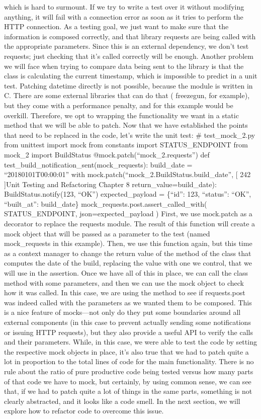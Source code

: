 \documentclass[a4paper,10pt,english]{sphinxmanual}
\begin{document}
which is hard to surmount. If we try to write a test over it without modifying anything, it
will fail with a connection error as soon as it tries to perform the HTTP connection.
As a testing goal, we just want to make sure that the information is composed correctly, and
that library requests are being called with the appropriate parameters. Since this is an
external dependency, we don’t test requests; just checking that it’s called correctly will be
enough.
Another problem we will face when trying to compare data being sent to the library is that
the class is calculating the current timestamp, which is impossible to predict in a unit test.
Patching datetime directly is not possible, because the module is written in C. There are
some external libraries that can do that ( freezegun, for example), but they come with a
performance penalty, and for this example would be overkill. Therefore, we opt to
wrapping the functionality we want in a static method that we will be able to patch.
Now that we have established the points that need to be replaced in the code, let’s write the
unit test:
\# test\_mock\_2.py
from unittest import mock
from constants import STATUS\_ENDPOINT
from mock\_2 import BuildStatus
@mock.patch(“mock\_2.requests”)
def test\_build\_notification\_sent(mock\_requests):
build\_date = “2018\sphinxhyphen{}01\sphinxhyphen{}01T00:00:01”
with mock.patch(“mock\_2.BuildStatus.build\_date”,
{[} 242 {]}Unit Testing and Refactoring
Chapter 8
return\_value=build\_date):
BuildStatus.notify(123, “OK”)
expected\_payload = \{“id”: 123, “status”: “OK”, “built\_at”:
build\_date\}
mock\_requests.post.assert\_called\_with(
STATUS\_ENDPOINT, json=expected\_payload
)
First, we use mock.patch as a decorator to replace the requests module. The result of this
function will create a mock object that will be passed as a parameter to the test
(named mock\_requests in this example). Then, we use this function again, but this time as
a context manager to change the return value of the method of the class that computes the
date of the build, replacing the value with one we control, that we will use in the assertion.
Once we have all of this in place, we can call the class method with some parameters, and
then we can use the mock object to check how it was called. In this case, we are using the
method to see if requests.post was indeed called with the parameters as we wanted
them to be composed.
This is a nice feature of mocks—not only do they put some boundaries around all external
components (in this case to prevent actually sending some notifications or issuing HTTP
requests), but they also provide a useful API to verify the calls and their parameters.
While, in this case, we were able to test the code by setting the respective mock objects in
place, it’s also true that we had to patch quite a lot in proportion to the total lines of code for
the main functionality. There is no rule about the ratio of pure productive code being tested
versus how many parts of that code we have to mock, but certainly, by using common
sense, we can see that, if we had to patch quite a lot of things in the same parts, something
is not clearly abstracted, and it looks like a code smell.
In the next section, we will explore how to refactor code to overcome this issue.
\end{document}
